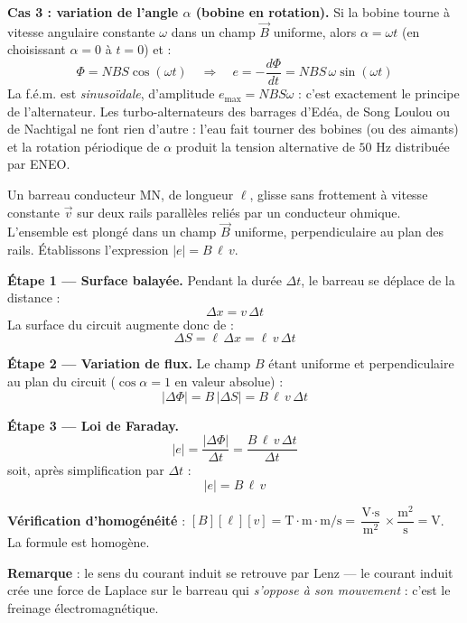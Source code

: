 \documentclass[11pt]{article}
\newcommand{\cle}[1]{{\popxbold\color{popdark}#1}}
\begin{document}
\textbf{Cas 3 : variation de l'angle $\alpha$ (bobine en rotation).} Si la bobine tourne à vitesse angulaire constante $\omega$ dans un champ $\vec{B}$ uniforme, alors $\alpha = \omega t$ (en choisissant $\alpha = 0$ à $t = 0$) et :
\[ \Phi = N B S \cos(\omega t) \quad \Longrightarrow \quad e = -\frac{d\Phi}{dt} = N B S \, \omega \sin(\omega t) \]
La f.é.m. est \emph{sinusoïdale}, d'amplitude $e_{\max} = N B S \omega$ : c'est exactement le \cle{principe de l'alternateur}. Les turbo-alternateurs des barrages d'Edéa, de Song Loulou ou de Nachtigal ne font rien d'autre : l'eau fait tourner des bobines (ou des aimants) et la rotation périodique de $\alpha$ produit la tension alternative de $50$ Hz distribuée par ENEO.

\begin{experience}
Un barreau conducteur MN, de longueur $\ell$, glisse sans frottement à vitesse constante $\vec{v}$ sur deux rails parallèles reliés par un conducteur ohmique. L'ensemble est plongé dans un champ $\vec{B}$ uniforme, perpendiculaire au plan des rails. Établissons l'expression $|e| = B \, \ell \, v$.

\textbf{Étape 1 — Surface balayée.} Pendant la durée $\Delta t$, le barreau se déplace de la distance :
\[ \Delta x = v \, \Delta t \]
La surface du circuit augmente donc de :
\[ \Delta S = \ell \, \Delta x = \ell \, v \, \Delta t \]

\textbf{Étape 2 — Variation de flux.} Le champ $B$ étant uniforme et perpendiculaire au plan du circuit ($\cos \alpha = 1$ en valeur absolue) :
\[ |\Delta \Phi| = B \, |\Delta S| = B \, \ell \, v \, \Delta t \]

\textbf{Étape 3 — Loi de Faraday.}
\[ |e| = \frac{|\Delta \Phi|}{\Delta t} = \frac{B \, \ell \, v \, \Delta t}{\Delta t} \]
soit, après simplification par $\Delta t$ :
\[ \boxed{|e| = B \, \ell \, v} \]

\textbf{Vérification d'homogénéité} : $[B][\ell][v] = \text{T} \cdot \text{m} \cdot \text{m/s} = \dfrac{\text{V} \cdot \text{s}}{\text{m}^2} \times \dfrac{\text{m}^2}{\text{s}} = \text{V}$. La formule est homogène.

\textbf{Remarque} : le sens du courant induit se retrouve par Lenz — le courant induit crée une force de Laplace sur le barreau qui \emph{s'oppose à son mouvement} : c'est le freinage électromagnétique.
\end{experience}
\end{document}
